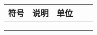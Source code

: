\documentclass[../main.tex]{subfiles}
\begin{document}




\begin{table}[H]
\centering
\tabcolsep=2cm%
\begin{tabular}{ccccc}
\toprule[1.5pt]
符号 & 说明 & 单位  \\ 
\midrule[1pt]
&         &                    \\
&         &                 \\
&         &                 \\

\bottomrule[1.5pt]
\end{tabular}
\end{table}
\end{document}
